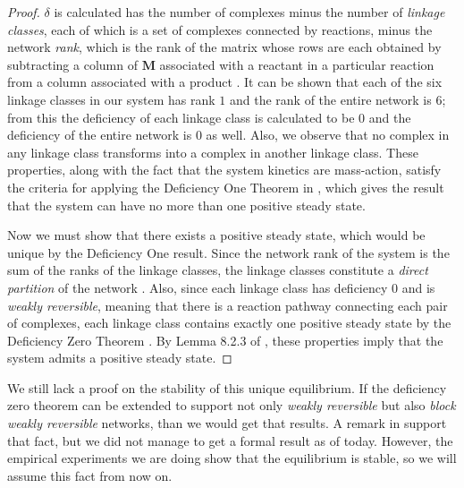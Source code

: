 \begin{proof}
        $\delta$ is calculated has the number of complexes minus the number of {\it linkage classes}, each of which
        is a set of complexes connected by reactions, minus the network {\it
        rank}, which is the rank of the matrix whose rows are each obtained
        by subtracting a column of $\mathbf{M}$ associated with a reactant
        in a particular reaction from a column associated with a product
        \cite{Feinberg:1987p9428}.  It can be shown that each of the six
        linkage classes in our system has rank $1$ and the rank of the
        entire network is $6$; from this the deficiency of each linkage
        class is calculated to be $0$ and the deficiency of the entire
        network is $0$ as well. Also, we observe that no complex in any
        linkage class transforms into a complex in another linkage class.
        These properties, along with the fact that the system kinetics are
        mass-action, satisfy the criteria for applying the Deficiency One
        Theorem in \cite{Feinberg:1987p9428}, which gives the result that
        the system can have no more than one positive steady state.

        Now we must show that there exists a positive steady state, which
        would be unique by the Deficiency One result.  Since the network
        rank of the system is the sum of the ranks of the linkage classes,
        the linkage classes constitute a {\it direct partition} of the
        network \cite{Feinberg:1995p9419}.  Also, since each linkage class
        has deficiency $0$ and is {\it weakly reversible}, meaning that
        there is a reaction pathway connecting each pair of complexes, each
        linkage class contains exactly one positive steady state by the
        Deficiency Zero Theorem \cite{Feinberg:1987p9428}.  By Lemma 8.2.3
        of \cite{Feinberg:1995p9419}, these properties imply that the system
        admits a positive steady state.

        \end{proof}

        We still lack a proof on the stability of this unique equilibrium. If the deficiency zero theorem \cite{Feinberg:1987p9428} can be extended to support not only \textit{weakly reversible} but also \textit{block weakly reversible} networks, than we would get that results. A remark in \cite{Chaves:2004p9259} support that fact, but we did not manage to get a formal result as of today. However, the empirical experiments we are doing show that the equilibrium is stable, so we will assume this fact from now on.

